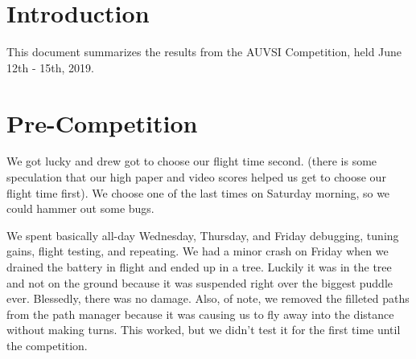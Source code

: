 \documentclass[]{auvsi_doc}
\begin{document}
\begin{AUVSITitlePage}
\begin{artifacttable}
\end{artifacttable}
\end{AUVSITitlePage}
\section{Introduction}
This document summarizes the results from the AUVSI Competition, held June 12th - 15th, 2019.

\section{Pre-Competition}
We got lucky and drew got to choose our flight time second. (there is some speculation that our high paper and video scores helped us get to choose our flight time first).
We choose one of the last times on Saturday morning, so we could hammer out some bugs.

We spent basically all-day Wednesday, Thursday, and Friday debugging, tuning gains, flight testing, and repeating. We had a minor crash on Friday when we drained the battery in flight and ended up in a tree. Luckily it was in the tree and not on the ground because it was suspended right over the biggest puddle ever. Blessedly, there was no damage. Also, of note, we removed the filleted paths from the path manager because it was causing us to fly away into the distance without making turns. This worked, but we didn’t test it for the first time until the competition.
\end{document}
